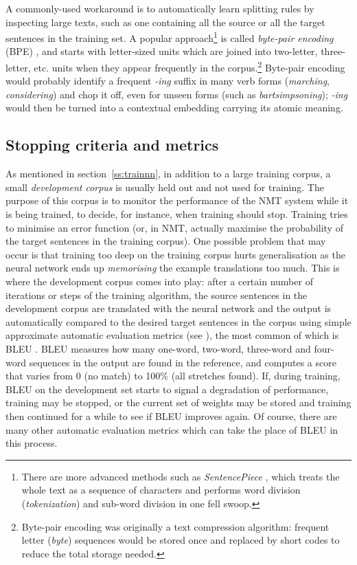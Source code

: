 \documentclass[output=paper,colorlinks,citecolor=brown]{langscibook}
\begin{document}
A commonly-used workaround is to automatically learn splitting rules by inspecting large texts, such as one containing all the source or all the target sentences in the training set. A popular approach\footnote{There are more advanced methods such as \emph{SentencePiece} \citep{kudo2018sentencepiece}, which treats the whole text as a sequence of characters and performs word division (\emph{tokenization}) and sub-word division in one fell swoop.} is called \emph{byte-pair encoding} (BPE) \citep{sennrich2015neural}, and starts with letter-sized units which are joined into two-letter, three-letter, etc. units when they appear frequently in the corpus.\footnote{Byte-pair encoding was originally a text compression algorithm: frequent letter (\emph{byte}) sequences would be stored once and replaced by short codes to reduce the total storage needed.} Byte-pair encoding would probably identify a frequent \emph{-ing} suffix in many verb forms (\emph{marching}, \emph{considering}) and chop it off, even for unseen forms (such as \emph{bartsimpsoning}); \emph{-ing} would then be turned into a contextual embedding carrying its atomic meaning. 


\subsection{Stopping criteria and metrics}\label{sec:perez:7.2}
\label{ss:stop}

As mentioned in section~\ref{ss:trainnn}, in addition to a large training corpus, a small \emph{development corpus} is usually held out and not used  for training. The purpose of this corpus is to monitor the performance of the NMT system while it is being trained, to decide, for instance, when training should stop. Training tries to minimise an error function (or, in NMT, actually maximise the probability of the target sentences in the training corpus). One possible problem that may occur is that training too deep on the training corpus hurts generalisation as the neural network ends up \emph{memorising} the example translations too much. This is where the development corpus comes into play: after a certain number of iterations or steps of the training 
algorithm, the source sentences in the development corpus are translated with the neural network and the output is automatically compared to the desired target sentences in the corpus using simple approximate automatic evaluation metrics (see ), the most common of which is BLEU \citep{papineni2002bleu}. BLEU measures how many one-word, two-word, three-word and four-word sequences in the output are found in the reference, and computes a score that varies from 0 (no match) to 100\% (all stretches found). If, during training, BLEU on the development set starts to signal a degradation of performance, training may be stopped, or the current set of weights may be stored and training
then continued for a while to see if BLEU improves again. Of course, there are many other automatic evaluation metrics which can take the place of BLEU in this process.
\end{document}
